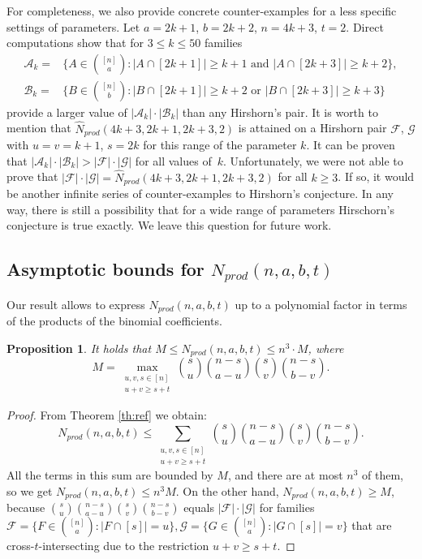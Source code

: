 \documentclass[12pt]{article}
\let\leq\leqslant
\let\geq\geqslant
\let\le\leq
\let\ge\geq
\def\F{{\mathcal F}}
\def\G{{\mathcal G}}
\def\A{{\mathcal A}}
\def\B{{\mathcal B}}
\newtheorem{proposition}[theorem]{Proposition}
\begin{document}
For completeness, we also provide concrete counter-examples for a less specific settings of parameters.
Let $a=2k+1$, $b=2k+2$, $n=4k+3$, $t=2$. Direct computations show that
for $3\leq k\leq 50$ families
\[
\begin{aligned}
  \A_k =& \big\{ A \in\binom{[n]}{a}: |A\cap[2k+1]|\geq k+1 \text{ and
  } |A\cap[2k+3]|\geq k+2 \big\},\\
  \B_k =& \big\{ B \in\binom{[n]}{b}: |B\cap[2k+1]|\geq k+2 \text{ or
  } |B\cap[2k+3]|\geq k+3 \big\}
\end{aligned}
\]
provide a larger value of $|\A_k|\cdot|\B_k|$ than any Hirshorn's
pair. It is worth to mention that   $\widehat N_{prod}(4k+3,2k+1,2k+3,2)$ is attained on a Hirshorn
pair $\F$, $\G$ with $u = v=k+1$, $s = 2k$ for this range of the parameter
$k$. It can be proven that $|\A_k|\cdot|\B_k|>|\F|\cdot |\G|$ for all
values of~$k$. 
Unfortunately, we were not able to prove that $|\F|\cdot |\G|
  =\widehat N_{prod}(4k+3,2k+1,2k+3,2) $ for all $k\geq 3$. If so, it
  would be another  infinite series of counter-examples to Hirshorn's
  conjecture. In any way,  there is still a possibility that for a wide range of parameters Hirschorn's conjecture is true exactly. We leave this question for future work.

\subsection{Asymptotic bounds for $N_{prod}(n, a, b, t)$}
Our result allows to express $N_{prod}(n, a, b, t)$ up to a polynomial factor in terms of the products of the binomial coefficients.
\begin{proposition}
\label{M_prop}
 It holds that
$M \le N_{prod}(n, a, b, t) \le n^3 \cdot M$, where
\begin{equation}
\label{M}
M = \max\limits_{\substack{ u, v, s\in [n] \\ u + v \ge s + t}} \binom{s}{u} \binom{n - s}{a - u} \binom{s}{v} \binom{n - s}{b - v}.
\end{equation}
\end{proposition}
\begin{proof}
From Theorem \ref{th:ref} we obtain:
$$N_{prod}(n, a, b, t) \le \sum\limits_{\substack{ u, v, s\in [n] \\ u + v \ge s + t}} \binom{s}{u} \binom{n - s}{a - u} \binom{s}{v} \binom{n - s}{b - v}.$$
All the terms in this sum are bounded by $M$, and there are at most $n^3$ of them, so we get
$N_{prod}(n, a, b, t)  \le n^3 M$.
On the other hand, $N_{prod}(n,a,b,t) \ge M$, because  $\binom{s}{u} \binom{n - s}{a - u} \binom{s}{v} \binom{n - s}{b - v}$ equals $|\F| \cdot |\G|$ 
 for families $\F = \{F\in\binom{[n]}{a} : |F\cap [s]| = u\}, \G= \{G\in\binom{[n]}{a} : |G\cap [s]| = v\}$ that are cross-$t$-intersecting due to the restriction $u + v \ge s + t$.
\end{proof}
\end{document}
